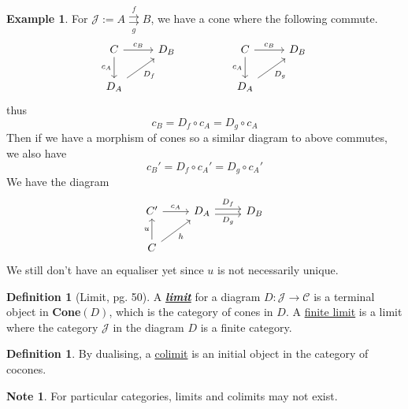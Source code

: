 \documentclass[11pt]{article} %
\theoremstyle{definition}
\newtheorem{definition}[theorem]{Definition}
\theoremstyle{definition}
\theoremstyle{definition}
\newtheorem{example/}[theorem]{Example}
\newtheorem{note}[theorem]{Note}
\newenvironment{example}
  {\renewcommand{\qedsymbol}{$\blacktriangle$}%
   \pushQED{\qed}\begin{example/}}
  {\popQED\end{example/}}
\begin{document}
\begin{example}
For $\mathcal{J} := A\overset{f}{\underset{g}{\rightrightarrows}}B$, 
we have a cone where the following commute.
\[\begin{tikzcd}
	C & {D_B} && C & {D_B} \\
	{D_A} &&& {D_A}
	\arrow["{c_B}", from=1-1, to=1-2]
	\arrow["{D_f}"', from=2-1, to=1-2]
	\arrow["{c_A}"', from=1-1, to=2-1]
	\arrow["{c_A}"', from=1-4, to=2-4]
	\arrow["{c_B}", from=1-4, to=1-5]
	\arrow["{D_g}"', from=2-4, to=1-5]
\end{tikzcd}\]
thus 
\[c_B=D_f\circ c_A=D_g\circ c_A\]
Then if we have a morphism of cones so a similar diagram to above commutes, we also have
\[c_B'=D_f\circ c_A'=D_g\circ c_A'\]
We have the diagram 
\[\begin{tikzcd}
	C' & {D_A} & {D_B} \\
	C
	\arrow["{c_A}", from=1-1, to=1-2]
	\arrow["{D_f}", shift left, from=1-2, to=1-3]
	\arrow["{D_g}"', shift right, from=1-2, to=1-3]
	\arrow["h"', from=2-1, to=1-2]
	\arrow["u", from=2-1, to=1-1]
\end{tikzcd}\]
We still don't have an equaliser yet since $u$ is not necessarily unique.
\end{example}
\begin{definition}[Limit, pg. 50]
    A \textbf{\textit{\underline{limit}}} for a diagram $D:\mathcal{J} \rightarrow \mathcal{C}$
    is a terminal object in \textbf{Cone}$(D)$, which is the category of cones in $D$.
    A \underline{finite limit} is a limit where the category $\mathcal{J}$ in the diagram $D$ is a finite category.
\end{definition}
\begin{definition}
    By dualising, a \underline{colimit} is an initial object in the category of cocones.
\end{definition}
\begin{note}
    For particular categories, limits and colimits may not exist.
\end{note}
\end{document}
